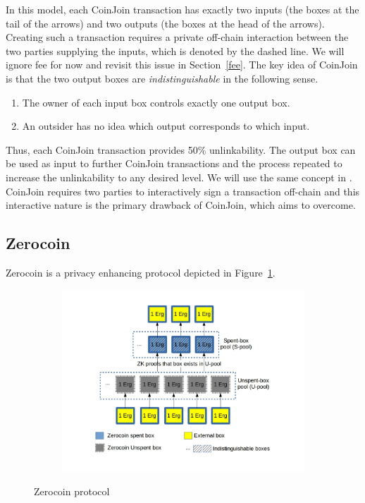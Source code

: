 \documentclass[runningheads]{llncs}
\newcommand{\zerocoin}{Zerocoin\xspace}
\begin{document}
In this model, each CoinJoin transaction has exactly two inputs (the boxes at the tail of the arrows) and two outputs (the boxes at the head of the arrows). Creating such a transaction requires a private off-chain interaction between the two parties supplying the inputs, which is denoted by the dashed line. We will ignore fee for now and revisit this issue in Section~\ref{fee}.
The key idea of CoinJoin is that the two output boxes are {\em indistinguishable} in the following sense. 
\begin{enumerate}
    \item The owner of each input box controls exactly one output box.
    \item An outsider has no idea which output corresponds to which input.
\end{enumerate}

Thus, each CoinJoin transaction provides 50\% unlinkability. The output box can be used as input to further CoinJoin transactions and the process repeated to increase the unlinkability to any desired level. We will use the same concept in \algname. 
CoinJoin requires two parties to interactively sign a transaction off-chain and this interactive nature is the primary drawback of CoinJoin, which \algname aims to overcome. 

\subsection{\zerocoin}
\label{zerocoin} 

\zerocoin is a privacy enhancing protocol depicted in Figure~\ref{fig:zerocoin}. 

\begin{figure}[h]
	\centering
	\begin{subfigure}{.7\textwidth}
		\centering
		\includegraphics[width=\linewidth]{Zerocoin.jpg}
	\end{subfigure}
	\caption{\zerocoin protocol}
	\label{fig:zerocoin}
\end{figure}
\end{document}
